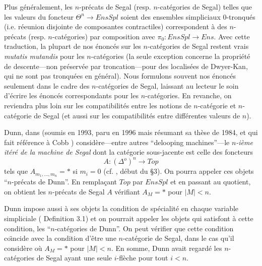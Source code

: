 \documentclass[12pt]{article}
\begin{document}
Plus g\'en\'eralement, les $n$-pr\'ecats de Segal
(resp. $n$-cat\'egories de Segal)
telles que les valeurs du foncteur $\Theta ^n \rightarrow EnsSpl$
soient des ensembles simpliciaux $0$-tronqu\'es (i.e. r\'eeunion disjointe de
composantes contractiles) correspondent \`a des $n$-pr\'ecats
(resp. $n$-cat\'egories) par composition avec $\pi _0: EnsSpl
\rightarrow Ens$. Avec cette traduction, la plupart de nos \'enonc\'es sur les
$n$-cat\'egories de Segal restent vrais {\em mutatis mutandis} pour les
$n$-cat\'egories (la seule exception concerne la propri\'et\'e de
descente---non pr\'eserv\'ee par troncation---pour des localis\'ees de
Dwyer-Kan, qui ne sont pas tronqu\'ees en g\'en\'eral). Nous formulons
souvent nos
\'enonc\'es seulement dans le cadre des $n$-cat\'egories de Segal, laissant au
lecteur le soin d'\'ecrire les \'enonc\'es correspondants pour les
$n$-cat\'egories.
En revanche, on reviendra plus loin sur les compatibilit\'es entre les
notions de
$n$-cat\'egorie et $n$-cat\'egorie de Segal (et aussi sur les compatibilit\'es
entre diff\'erentes valeurs de $n$).

Dunn, dans \cite{Dunn} (soumis en 1993, paru en 1996 mais r\'esumant sa th\`ese
de 1984, et qui fait
r\'ef\'erence \`a Cobb \cite{Cobb})
consid\`ere---entre autres ``delooping machines''---le {\em $n$-i\`eme
it\'er\'e de la machine de Segal} dont la cat\'egorie sous-jacente est celle des
foncteurs
$$
A: (\Delta ^o) ^n\rightarrow Top
$$
tels que $A_{m_1,\ldots , m_n}=\ast$ si $m_i=0$ (cf. \cite{Dunn}, d\'ebut du
\S 3). On pourra appeler ces objets ``$n$-pr\'ecats de Dunn''.
En rempla\c{c}ant $Top$ par $EnsSpl$ et en passant au quotient, on obtient
les $n$-pr\'ecats de Segal $A$ v\'erifiant $A_M=\ast$ pour
$|M|<n$.

Dunn impose aussi \`a ses objets la
condition de sp\'ecialit\'e en chaque variable simpliciale
(\cite{Dunn} Definition 3.1) et on pourrait appeler les objets qui satisfont
\`a cette condition, les ``$n$-cat\'egories de Dunn''. On peut v\'erifier que
cette
condition co\"{\i}ncide avec la condition d'\^etre une $n$-cat\'egorie de
Segal, dans
le cas qu'il consid\`ere o\`u $A_M= \ast$ pour $|M|< n$.
En somme, Dunn avait regard\'e les $n$-cat\'egories de Segal ayant une
seule $i$-fl\`eche pour tout $i< n$.
\end{document}
